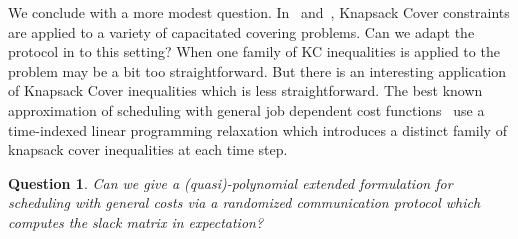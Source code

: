 \documentclass[letterpaper,12pt,oneside,onecolumn]{article}
\newtheorem{question}[fact]{Question}
\begin{document}
We conclude with a more modest question. In ~\cite{carnes2008primal}and~\cite{carr1999strengthening}, Knapsack Cover constraints are applied to a variety of capacitated covering problems. Can we adapt the protocol in \cite{bazzi2017small} to this setting?  When one family of KC inequalities is applied to the problem may be a bit too straightforward. But there is an interesting application of Knapsack Cover inequalities which is less straightforward. The best known approximation of scheduling with general job dependent cost functions~\cite{cheung2017primal} use a time-indexed linear programming relaxation which introduces a distinct family of knapsack cover inequalities at each time step.
\begin{question}
Can we give a (quasi)-polynomial extended formulation for scheduling with general costs via a randomized communication protocol which computes the slack matrix in expectation?
\end{question}



\end{document}
